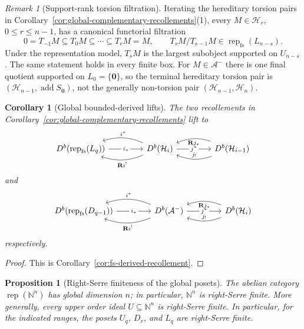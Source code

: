 \documentclass[12pt,reqno]{amsart}
\newtheorem{proposition}[theorem]{Proposition}
\newtheorem{corollary}[theorem]{Corollary}
\theoremstyle{definition}
\theoremstyle{remark}
\newtheorem{remark}[theorem]{Remark}
\newcommand{\Rep}{\operatorname{rep}}
\begin{document}
\begin{remark}[Support-rank torsion filtration]\label{rem:support-rank-torsion-filtration}
Iterating the hereditary torsion pairs in
Corollary~\ref{cor:global-complementary-recollements}(1), every
$M\in\mathcal H_r$, $0\le r\le n-1$, has a canonical functorial filtration
\[
0=T_{-1}M\subseteq T_0M\subseteq\cdots\subseteq T_rM=M,
\qquad
T_sM/T_{s-1}M\in\Rep_{\mathrm{fs}}(L_{n-s}).
\]
Under the representation model, $T_sM$ is the largest subobject supported on
$U_{n-s}$.  The same statement holds in every finite box.  For
$M\in\mathcal A^-$ there is one final quotient supported on
$L_0=\{\mathbf0\}$, so the terminal hereditary torsion pair is
$(\mathcal H_{n-1},\operatorname{add}S_{\mathbf0})$, not the generally
non-torsion pair $(\mathcal H_{n-1},\mathcal H_n)$.
\end{remark}

\begin{corollary}[Global bounded-derived lifts]
\label{cor:global-derived-recollements}
The two recollements in
Corollary~\ref{cor:global-complementary-recollements} lift to
\[
\begin{tikzcd}[column sep=4.2em]
D^b\!\left(\Rep_{\mathrm{fs}}(L_q)\right)
  \arrow[r, "i_*" description]
& D^b(\mathcal H_i)
  \arrow[l, bend right=20, "i^*"']
  \arrow[l, bend left=20, "\mathbf R i^!"]
  \arrow[r, "j^*" description]
& D^b(\mathcal H_{i-1})
  \arrow[l, bend left=20, "j_!"']
  \arrow[l, bend right=20, "\mathbf R j_*"]
\end{tikzcd}
\]
and
\[
\begin{tikzcd}[column sep=4.2em]
D^b\!\left(\Rep_{\mathrm{fs}}(D_{q-1})\right)
  \arrow[r, "i_*" description]
& D^b(\mathcal A^-)
  \arrow[l, bend right=20, "i^*"']
  \arrow[l, bend left=20, "\mathbf R i^!"]
  \arrow[r, "j^*" description]
& D^b(\mathcal H_i)
  \arrow[l, bend left=20, "j_!"']
  \arrow[l, bend right=20, "\mathbf R j_*"]
\end{tikzcd}
\]
respectively.
\end{corollary}

\begin{proof}
This is Corollary~\ref{cor:fs-derived-recollement}.
\end{proof}

\begin{proposition}[Right-Serre finiteness of the global posets]
\label{prop:global-right-serre-finiteness}
The abelian category $\Rep(\mathbb N^n)$ has global dimension $n$; in
particular, $\mathbb N^n$ is right-Serre finite.  More generally, every upper order ideal $U\subseteq\mathbb N^n$ is
right-Serre finite.  In particular, for the indicated ranges, the posets
$U_q$, $D_r$, and $L_q$ are right-Serre finite.
\end{proposition}
\end{document}
